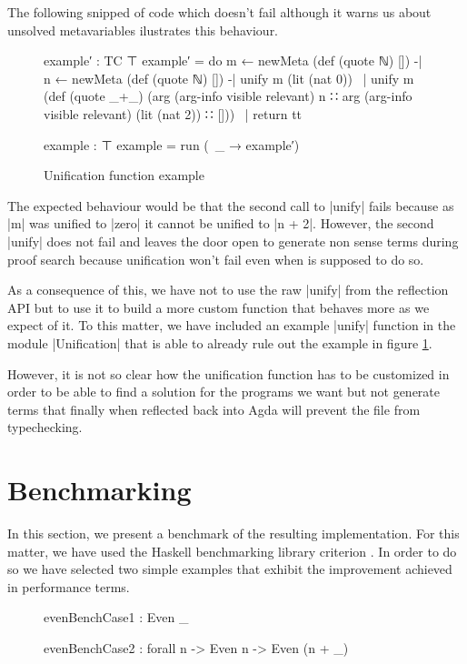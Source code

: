 \documentclass[a4paper]{article}
\begin{document}
The following snipped of code which doesn't fail although it warns us about
unsolved metavariables ilustrates this behaviour.

\begin{figure}[h]
\small
\begin{code}
    example′ : TC ⊤
    example′ =
      do m ← newMeta (def (quote ℕ) [])
      -| n ← newMeta (def (quote ℕ) [])
      -| unify m (lit (nat 0))
      ~| unify m (def (quote _+_)
                 (arg (arg-info visible relevant) n ∷
                 arg (arg-info visible relevant) (lit (nat 2)) ∷ []))
      ~| return tt

    example : ⊤
    example = run (\ _ → example′)
\end{code}
  \label{fig:examplebad}
  \caption{Unification function example}
\end{figure}

The expected behaviour would be that the second call to |unify| fails because
as |m| was unified to |zero| it cannot be unified to |n + 2|. However, the
second |unify| does not fail and leaves the door open to generate non sense
terms during proof search because unification won't fail even when is supposed
to do so.

As a consequence of this, we have not to use the raw |unify| from the reflection
API but to use it to build a more custom function that behaves more as we expect
of it. To this matter, we have included an example |unify| function in the
module |Unification| that is able to already rule out the example in figure
\ref{fig:examplebad}.

However, it is not so clear how the unification function has to be customized in
order to be able to find a solution for the programs we want but not generate
terms that finally when reflected back into Agda will prevent the file from
typechecking.

\section{Benchmarking}
\label{sec:benchmark}

In this section, we present a benchmark of the resulting implementation. For
this matter, we have used the Haskell benchmarking library criterion
. In order to do so we have
selected two simple examples that exhibit the improvement achieved in
performance terms.

\begin{figure}[h]
  \begin{code}
    evenBenchCase1 : Even _

    evenBenchCase2 : forall {n} -> Even n -> Even (n + _)
  \end{code}
\end{figure}
\end{document}
